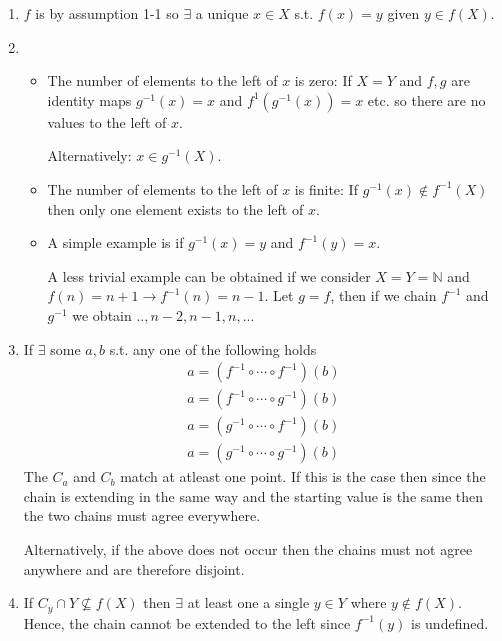 \begin{enumerate}[label=(\alph*)]
    \item 
    $f$ is by assumption 1-1 so $\exists$ a unique $x\in X$ s.t. $f(x)=y$ given $y\in f(X)$.

    \item 
    \begin{itemize}
        \item 
        The number of elements to the left of $x$ is zero: 
        If $X=Y$ and $f, g$ are identity maps $g^{-1}(x)=x$ and $f^{1}(g^{-1}(x))=x$ etc. so
        there are no values to the left of $x$.

        Alternatively: $x\in g^{-1}(X)$.

        \item 
        The number of elements to the left of $x$ is finite: 
        If $g^{-1}(x) \not\in f^{-1}(X)$ then only one element exists to the left of $x$.

        \item 
        A simple example is if $g^{-1}(x) = y$ and $f^{-1}(y) = x$.
        
        A less trivial example can be obtained if we consider $X=Y=\mathbb{N}$ and 
        $f(n) = n+1 \rightarrow f^{-1}(n)=n-1$. Let $g=f$, then if we chain $f^{-1}$ and 
        $g^{-1}$ we obtain $..,n-2, n-1, n, ...$
    \end{itemize}

    \item 
    If $\exists$ some $a, b$ s.t. any one of the following holds
    \begin{gather*}
        a = (f^{-1} \circ \cdots \circ f^{-1})(b) \\
        a = (f^{-1} \circ \cdots \circ g^{-1})(b) \\
        a = ( g^{-1} \circ \cdots  \circ f^{-1})(b) \\
        a = ( g^{-1} \circ \cdots \circ g^{-1} )(b)
    \end{gather*}
    The $C_a$ and $C_b$ match at atleast one point. If this is the case then since
    the chain is extending in the same way and the starting value is the same then 
    the two chains must agree everywhere.

    Alternatively, if the above does not occur then the chains must not agree anywhere
    and are therefore disjoint.

    \item
    If $C_y \cap Y\not\subseteq f(X)$ then $\exists$ at least one a single $y\in Y$ where
    $y \not\in f(X)$. Hence, the chain cannot be extended to the left since $f^{-1}(y)$
    is undefined.


\end{enumerate}
